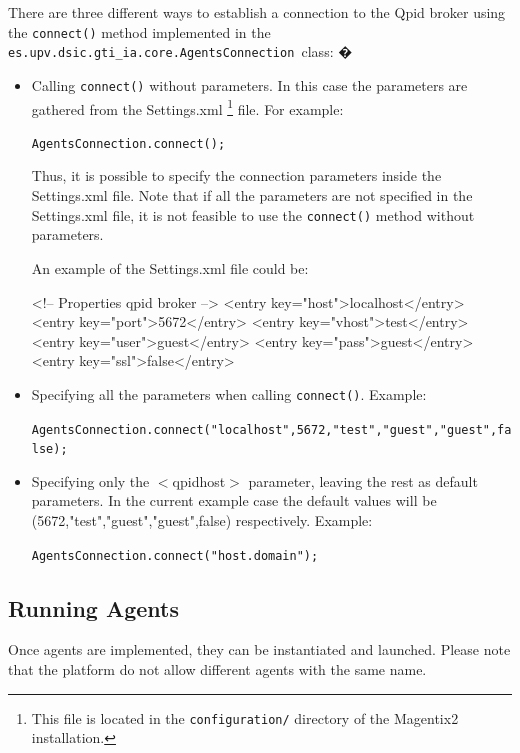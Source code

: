 There are three different ways to establish a connection to the Qpid broker  using the \lstinline|connect()| method implemented in the  \lstinline|es.upv.dsic.gti_ia.core.AgentsConnection |class:
�



\begin{itemize}
\item Calling \lstinline|connect()| without parameters. In this case the parameters are gathered from the Settings.xml \footnote{This file is located in the \texttt{configuration/} directory of the Magentix2 installation.} file. For example:\\
\begin{center}
 \lstinline|AgentsConnection.connect();|
\end{center}


Thus, it is possible to specify the connection parameters inside the Settings.xml file. Note that if all the parameters are not specified in the Settings.xml file, it is not feasible to use the \lstinline|connect()| method without parameters.

An example of the Settings.xml  file could be:

\begin{codigo}
   <!-- Properties qpid broker -->
    <entry key="host">localhost</entry>
    <entry key="port">5672</entry>
    <entry key="vhost">test</entry>
    <entry key="user">guest</entry>
    <entry key="pass">guest</entry>
    <entry key="ssl">false</entry>
\end{codigo}

\item Specifying all the parameters when calling \lstinline|connect()|. Example:
\begin{center}
\lstinline|AgentsConnection.connect("localhost",5672,"test","guest","guest",false);|
\end{center}

\item Specifying only the $<$qpidhost$>$ parameter, leaving the rest as default parameters. In the current example case the default values will be  (5672,"test","guest","guest",false) respectively. Example:
\begin{center}
\lstinline|AgentsConnection.connect("host.domain");|
\end{center}
\end{itemize}

\subsection{Running Agents}
Once agents are implemented, they can be instantiated and launched. Please note that the platform do not allow different agents with the same name.

